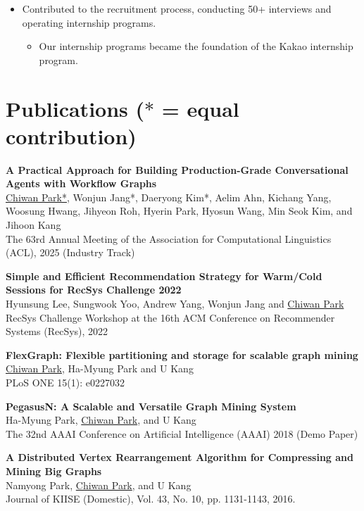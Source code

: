 \documentclass[11pt,a4paper]{article}
\newenvironment{entry}{
  \begin{list}{}{
    \setlength{\leftmargin}{0em}
    \setlength{\itemsep}{0.25em}
    \setlength{\parskip}{0pt}
    \setlength{\parsep}{0.25em}
  }
}{
  \end{list}
}
\begin{document}
\begin{entry}
\begin{itemize}
\begin{itemize}
    \end{itemize}
    \item Contributed to the recruitment process, conducting 50+ interviews and operating internship programs.
    \begin{itemize}
      \item Our internship programs became the foundation of the Kakao internship program.
    \end{itemize}
  \end{itemize}
\end{entry}

\section*{Publications {\scriptsize ($\ast$ = equal contribution)}}
\begin{entry}
  \item \textbf{A Practical Approach for Building Production-Grade Conversational Agents with Workflow Graphs}\\
  \underline{Chiwan Park*}, Wonjun Jang*, Daeryong Kim*, Aelim Ahn, Kichang Yang, Woosung Hwang, Jihyeon Roh, Hyerin Park, Hyosun Wang, Min Seok Kim, and Jihoon Kang\\
  The 63rd Annual Meeting of the Association for Computational Linguistics (ACL), 2025 (Industry Track)
  \item \textbf{Simple and Efficient Recommendation Strategy for Warm/Cold Sessions for RecSys Challenge 2022}\\
  Hyunsung Lee, Sungwook Yoo, Andrew Yang, Wonjun Jang and \underline{Chiwan Park}\\
  RecSys Challenge Workshop at the 16th ACM Conference on Recommender Systems (RecSys), 2022
  \item \textbf{FlexGraph: Flexible partitioning and storage for scalable graph mining}\\
  \underline{Chiwan Park}, Ha-Myung Park and U Kang\\
  PLoS ONE 15(1): e0227032
  \item \textbf{PegasusN: A Scalable and Versatile Graph Mining System}\\
  Ha-Myung Park, \underline{Chiwan Park}, and U Kang\\
  The 32nd AAAI Conference on Artificial Intelligence (AAAI) 2018 (Demo Paper)
  \item \textbf{A Distributed Vertex Rearrangement Algorithm for Compressing and Mining Big Graphs}\\
  Namyong Park, \underline{Chiwan Park}, and U Kang\\
  Journal of KIISE (Domestic), Vol. 43, No. 10, pp. 1131-1143, 2016.
\end{entry}
\end{document}
